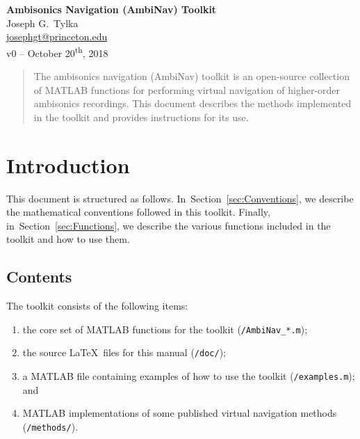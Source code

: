 \documentclass[11pt, oneside]{article}
\newcommand{\secref}[1]{Section~\ref{#1}}
\begin{document}
\begin{centering}
{\Large \textbf{Ambisonics Navigation (AmbiNav) Toolkit}}\\
\vspace{\baselineskip}
Joseph G.~Tylka\\
\href{mailto:josephgt@princeton.edu}{josephgt@princeton.edu}\\
\vspace{\baselineskip}
v0 -- October 20\textsuperscript{th}, 2018\\
\end{centering}

\begin{abstract}
The ambisonics navigation (AmbiNav) toolkit is an open-source collection of MATLAB functions for performing virtual navigation of higher-order ambisonics recordings.
This document describes the methods implemented in the toolkit and provides instructions for its use.
\end{abstract}

\section{Introduction}
This document is structured as follows.
In~\secref{sec:Conventions}, we describe the mathematical conventions followed in this toolkit.
Finally, in~\secref{sec:Functions}, we describe the various functions included in the toolkit and how to use them.

\subsection{Contents}
The toolkit consists of the following items:
\begin{enumerate}
\item the core set of MATLAB functions for the toolkit (\texttt{/AmbiNav\_*.m});
\item the source \LaTeX~files for this manual (\texttt{/doc/});
\item a MATLAB file containing examples of how to use the toolkit (\texttt{/examples.m}); and
\item MATLAB implementations of some published virtual navigation methods (\texttt{/methods/}).
\end{enumerate}

\end{document}
